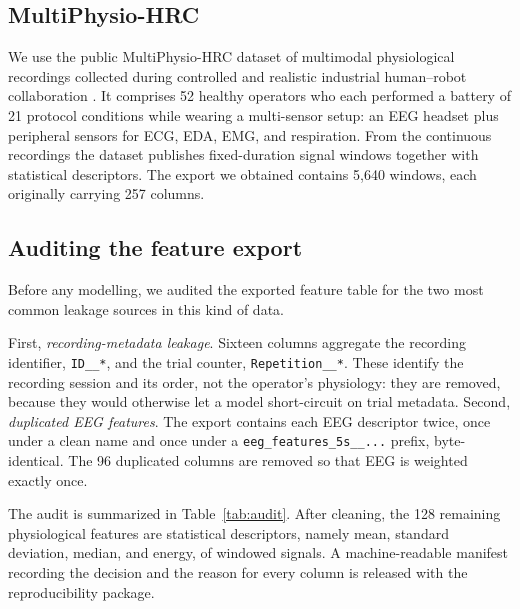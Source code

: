 \documentclass{llncs}
\begin{document}
\subsection{MultiPhysio-\ac{HRC}}

We use the public MultiPhysio-\ac{HRC} dataset of multimodal physiological recordings
collected during controlled and realistic industrial human--robot collaboration
\cite{bussolan2025multiphysiohrc}. It comprises 52 healthy operators who each
performed a battery of 21 protocol conditions while wearing a multi-sensor setup: an
\ac{EEG} headset plus peripheral sensors for \ac{ECG}, \ac{EDA}, \ac{EMG}, and
respiration. From the continuous recordings the dataset publishes fixed-duration
signal windows together with statistical descriptors. The export we obtained contains
5{,}640 windows, each originally carrying 257 columns.

\subsection{Auditing the feature export}

Before any modelling, we audited the exported feature table for the two most common
leakage sources in this kind of data.

First, \emph{recording-metadata leakage}. Sixteen columns aggregate the recording
identifier, \texttt{ID\_\_*}, and the trial counter, \texttt{Repetition\_\_*}. These
identify the recording session and its order, not the operator's physiology: they are
removed, because they would otherwise let a model short-circuit on trial metadata.
Second, \emph{duplicated \ac{EEG} features}. The export contains each \ac{EEG}
descriptor twice, once under a clean name and once under a
\texttt{eeg\_features\_5s\_\_...} prefix, byte-identical. The 96 duplicated columns are
removed so that \ac{EEG} is weighted exactly once.

The audit is summarized in Table~\ref{tab:audit}. After cleaning, the 128 remaining
physiological features are statistical descriptors, namely mean, standard deviation,
median, and energy, of windowed signals. A machine-readable manifest recording the decision
and the reason for every column is released with the reproducibility package.
\end{document}
